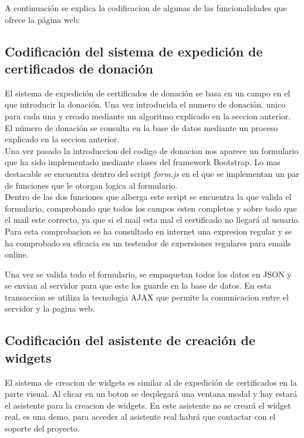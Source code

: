 
A continuación se explica la codificacion de algunas de las funcionalidades que ofrece la página web:

\subsection{Codificación del sistema de expedición de certificados de donación}
El sistema de expedición de certificados de donación se basa en un campo en el que introducir la donación. Una vez introducida el numero de donación, unico para cada una y creado mediante un algoritmo explicado en la seccion anterior. El número de donación se consulta en la base de datos mediante un proceso explicado en la seccion anterior.\\

Una vez pasado la introduccion del codigo de donacion nos aparece un formulario que ha sido implementado mediante clases del framework Bootstrap. Lo mas destacable se encuentra dentro del script \textit{form.js} en el que se implementan un par de funciones que le otorgan logica al formulario.\\

Dentro de las dos funciones que alberga este script se encuentra la que valida el formulario, comprobando que todos los campos esten completos y sobre todo que el mail este correcto, ya que si el mail esta mal el certificado no llegará al usuario. Para esta comprobacion se ha consultado en internet una expresion regular y se ha comprobado su eficacia en un testeador de expersiones regulares para emails online. \\
\newpage


Una vez se valida todo el formulario, se empaquetan todos los datos en JSON y se envian al servidor para que este los guarde en la base de datos. En esta transaccion se utiliza la tecnologia AJAX\cite{ajax} que permite la comunicacion entre el servidor y la pagina web.\\


\subsection{Codificación del asistente de creación de widgets}
El sistema de creacion de widgets es similar al de expedición de certificados en la parte visual. Al clicar en un boton se desplegará una ventana modal y hay estará el asistente para la creacion de widgets. En este asistente no se creará el widget real, es una demo, para acceder al asistente real habrá que contactar con el soporte del proyecto.\\

